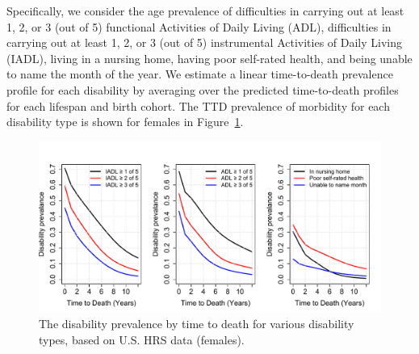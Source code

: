\documentclass[12pt,oneside,a4paper]{article} %
\begin{document}
Specifically, we consider the age prevalence of difficulties in carrying out at
least 1, 2, or 3 (out of 5) functional Activities of Daily Living (ADL),
difficulties in carrying out at least 1, 2, or 3 (out of 5) instrumental
Activities of Daily Living (IADL), living in a nursing home, having poor
self-rated health, and being unable to name the month of the year. We estimate
a linear time-to-death prevalence profile for each disability by averaging over the predicted time-to-death profiles for each lifespan and birth cohort.
 The TTD prevalence of morbidity for
each disability type is shown for females in Figure~\ref{fig:DisbyTTD}.


\begin{figure}
\begin{adjustwidth}{-1.5cm}{}
	\centering
	\includegraphics[scale=.6]{Figures/fig4.pdf} %
	\caption{The disability prevalence by time to death for various disability types, based on U.S. HRS data (females).}
	\label{fig:DisbyTTD}
\end{adjustwidth}
\end{figure}
\end{document}

